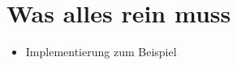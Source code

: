 \setcounter{chapter}{1}
\setcounter{section}{0}
\setcounter{table}{0}
\setcounter{figure}{0}

\section{Was alles rein muss}

\begin{itemize}
	\item Implementierung zum Beispiel
\end{itemize}